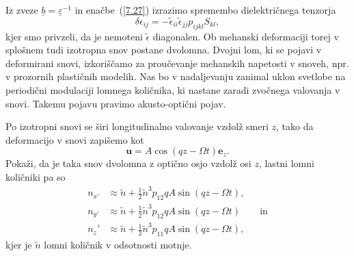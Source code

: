 Iz zveze $\underline{b} = \underline{\varepsilon}^{-1}$ in enačbe~(\ref{7.27}) izrazimo
spremembo dielektričnega tenzorja 
\begin{equation}
\delta\epsilon_{ij}=-\tilde{\epsilon}_{ii}\tilde{\epsilon}_{jj}p_{ijkl}S_{kl},
\label{7.29}
\end{equation}
kjer smo privzeli, da je nemoteni $\tilde{\epsilon}$ diagonalen. Ob mehanski deformaciji
torej v splošnem tudi izotropna snov postane dvolomna.
Dvojni lom, ki se pojavi v deformirani snovi, izkoriščamo za proučevanje
mehanskih napetosti v snoveh, npr. v prozornih plastičnih modelih. 
Nas bo v nadaljevanju zanimal uklon  svetlobe na periodični
modulaciji lomnega količnika, ki nastane zaradi zvočnega valovanja v snovi. Takemu pojavu
pravimo akusto-optični pojav.

\begin{naloga}
\label{nalogaAO}
Po izotropni snovi se širi longitudinalno valovanje vzdolž smeri $z$, tako da 
deformacijo v snovi zapišemo kot
\begin{equation}
\mathbf{u} = A \cos(q z - \Omega t)\mathbf{e}_z.
\end{equation}
Pokaži, da je taka snov dvolomna z optično osjo vzdolž osi $z$, lastni 
lomni količniki pa so 
\begin{align}
n_{x'} &\approx \tilde{n}+\frac{1}{2}\tilde{n}^3p_{12}q A \sin (q z - \Omega t),\\
n_{y'} &\approx \tilde{n}+\frac{1}{2}\tilde{n}^3p_{12}q A \sin (q z - \Omega t) \qquad \mathrm{in}\\
n_z' &\approx \tilde{n}+\frac{1}{2}\tilde{n}^3p_{11}q A \sin (q z - \Omega t),
\end{align}
kjer je $\tilde{n}$ lomni količnik v odsotnosti motnje.
\end{naloga}

